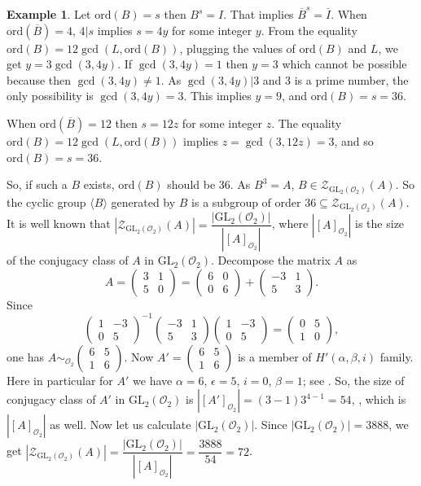 \documentclass[11pt,twoside]{amsart}
\newcommand{\GL}{\mathrm{GL}}
\newcommand{\R}{\mathscr{O}_2}
\newcommand{\Zen}{\mathscr{Z}}
\theoremstyle{definition} %
\newtheorem{example}[lemma]{Example}
\begin{document}
\begin{example}
Let $\textrm{ord}(B)=s$ then $B^s=I$. That implies $\overline{B}^s=\overline{I}.$ When $\textrm{ord}(\overline{B})=4$, $4|s$ implies $s=4y$ for some integer $y$. 
From the equality $\textrm{ord}(B)=12\gcd(L,\textrm{ord}(B))$, plugging the values of $\textrm{ord}(B)$ and $L$, we get $y=3\gcd(3,4y)$. 
If $\gcd(3,4y)=1$ then $y=3$ which cannot be possible because then $\gcd(3,4y)\neq1$. 
As $\gcd(3,4y)|3$ and $3$ is a prime number, the only possibility is $\gcd(3,4y)=3$. 
This implies $y=9$, and $\textrm{ord}(B)=s=36$.

When $\textrm{ord}(\overline{B})=12$ then $s=12z$ for some integer $z$. 
The equality $\textrm{ord}(B)=12\gcd(L,\textrm{ord}(B))$ implies $z=\gcd(3,12z)=3$, and so $\textrm{ord}(B)=s=36$.

So, if such a $B$ exists, $\textrm{ord}(B)$ should be $36$. 
As $B^3=A$, $B\in \Zen_{\GL_2(\R)}(A)$. 
So the cyclic group $\langle B\rangle$ generated by $B$ is a subgroup of order $36\subseteq\Zen_{\GL_2(\R)}(A)$. 
It is well known that $|\Zen_{\GL_2(\R)}(A)|=\dfrac{|\GL_2(\R)|}{|[A]_{\R}|}$, where $|[A]_{\R}|$ is the size of the conjugacy class of $A$ in $\GL_2(\R).$  
Decompose the matrix $A$ as 
$$A=\begin{pmatrix}
 3 & 1 \\
5 & 0
\end{pmatrix}=\begin{pmatrix}
 6 & 0 \\
0 & 6
\end{pmatrix}+\begin{pmatrix}
 -3 & 1 \\
5 & 3
\end{pmatrix}.$$ 
Since $$\begin{pmatrix}
 1 & -3 \\
0 & 5
\end{pmatrix}^{-1}\begin{pmatrix}
 -3 & 1 \\
5 & 3
\end{pmatrix}\begin{pmatrix}
 1 & -3 \\
0 & 5
\end{pmatrix}=\begin{pmatrix}
 0 & 5 \\
1 & 0
\end{pmatrix},$$ one has $A\sim_{\R} \begin{pmatrix}
 6 & 5 \\
1 & 6
\end{pmatrix}$.
Now $A'=\begin{pmatrix}
 6 & 5 \\
1 & 6
\end{pmatrix}$ is a member of $H'(\alpha,\beta,i)$ family. Here in particular for $A'$ we have $\alpha=6$, $\epsilon=5$, $i=0$, $\beta=1$; see .
So, the size of conjugacy class of $A'$ in $\GL_2(\R)$ is $|[A']_{\R}|=(3-1)3^{4-1}=54$, \cite[p. 1291]{BarringtonCliffWen2010}, which is $|[A]_{\R}|$ as well.
Now let us calculate $|\GL_2(\R)|$.
Since $|\GL_2(\R)|=3888$, we get $|\Zen_{\GL_2(\R)}(A)|=\dfrac{|\GL_2(\R)|}{|[A]_{\R}|}=\dfrac{3888}{54}=72$.


\end{example}
\end{document}
